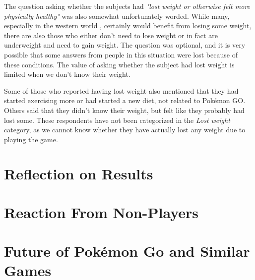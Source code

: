 The question asking whether the subjects had \emph{"lost weight or otherwise felt more physically healthy"} was also somewhat unfortunately worded. While many, especially in the western world , certainly would benefit from losing some weight, there are also those who either don't need to lose weight or in fact are underweight and need to gain weight. The question was optional, and it is very possible that some answers from people in this situation were lost because of these conditions. The value of asking whether the subject had lost weight is limited when we don't know their weight.

Some of those who reported having lost weight also mentioned that they had started exercising more or had started a new diet, not related to Pokémon GO. Others said that they didn't know their weight, but felt like they probably had lost some. These respondents have not been categorized in the \emph{Lost weight} category, as we cannot know whether they have actually lost any weight due to playing the game. 

\section{Reflection on Results}


\section{Reaction From Non-Players}


\section{Future of Pokémon Go and Similar Games}

